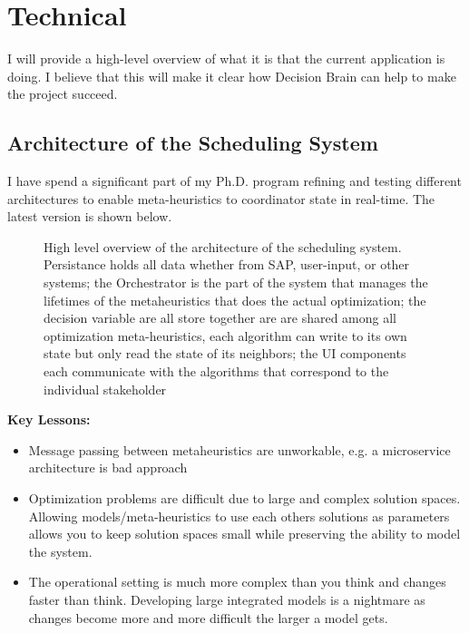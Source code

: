 \newpage
\section*{Technical}
\label{sec:technical}

I will provide a high-level overview of what it is that the current application is doing. I believe that 
this will make it clear how Decision Brain can help to make the project succeed.


\subsection*{Architecture of the Scheduling System}
I have spend a significant part of my Ph.D. program refining and testing different architectures to enable
meta-heuristics to coordinator state in real-time. The latest version is shown below.

\begin{figure}[H]
	\centering
	

	\caption{
		High level overview of the architecture of the scheduling system. Persistance holds
		all data whether from SAP, user-input, or other systems; the Orchestrator is the part of the 
		system that manages the lifetimes of the metaheuristics that does the actual optimization;
		the decision variable are all store together are are shared among all optimization meta-heuristics, 
		each algorithm can write to its own state but only read the state of its neighbors; the UI components
		each communicate with the algorithms that correspond to the individual stakeholder
	}
\end{figure}

\textbf{Key Lessons:}
\begin{itemize}
	\item Message passing between metaheuristics are unworkable, e.g. a microservice architecture is bad approach
	\item Optimization problems are difficult due to large and complex solution spaces. Allowing models/meta-heuristics
		  to use each others solutions as parameters allows you to keep solution spaces small while preserving the 
		  ability to model the system. 
	\item The operational setting is much more complex than you think and changes faster than think. Developing large integrated models 
		  is a nightmare as changes become more and more difficult the larger a model gets.
\end{itemize}

